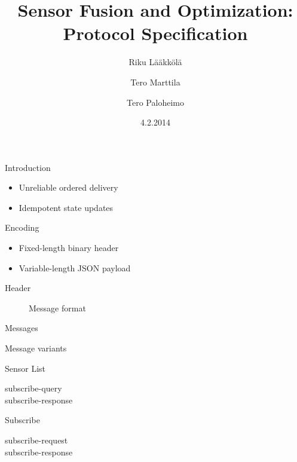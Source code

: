 \documentclass{beamer}
\title[SFO protocol]{Sensor Fusion and Optimization: Protocol Specification}
\author{Riku Lääkkölä \and Tero Marttila \and Tero Paloheimo}
\institute{Aalto ELEC}
\date{4.2.2014}
\begin{document}
\begin{frame}
  \titlepage
\end{frame}

\begin{frame}{Introduction}
\begin{itemize}
	\item Unreliable ordered delivery
    \item Idempotent state updates
\end{itemize}
\end{frame}

\begin{frame}{Encoding}
\begin{itemize}
	\item Fixed-length binary header
    \item Variable-length JSON payload
\end{itemize}
\end{frame}

\begin{frame}{Header}
\begin{figure}
	\centering
	{\scriptsize}
	\caption{Message format}
	\label{fig:header}
\end{figure}
\end{frame}

\begin{frame}{Messages}
\begin{table}
	\centering
	\caption{Message variants}
    {\scriptsize}
	\label{tbl:messages}
\end{table}
\end{frame}

\begin{frame}{Sensor List}
\begin{description}
	\item[subscribe-query]
    \item[subscribe-response]
\end{description}
\end{frame}

\begin{frame}{Subscribe}
\begin{description}
	\item[subscribe-request]
    \item[subscribe-response]
\end{description}
\end{frame}
\end{document}

